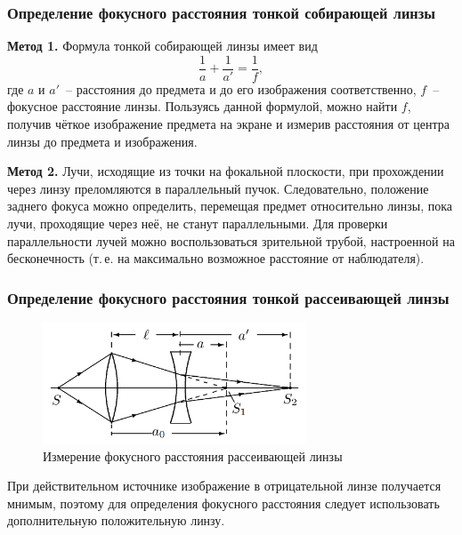 \documentclass[a4paper,12pt]{article} %
\begin{document}
\subsubsection*{Определение фокусного расстояния тонкой собирающей линзы}

\textbf{Метод 1.} Формула тонкой собирающей линзы имеет вид
\begin{equation} \label{convergingLens}
  \frac{1}{a} + \frac{1}{a'} = \frac{1}{f},
\end{equation}
где $a$ и $a'$~-- расстояния до предмета и до его изображения соответственно, $f$~-- фокусное расстояние линзы. Пользуясь данной формулой, можно найти $f$, получив чёткое изображение предмета на экране и измерив расстояния от центра линзы до предмета и изображения.

\textbf{Метод 2.} Лучи, исходящие из точки на фокальной плоскости, при прохождении через линзу преломляются в параллельный пучок. Следовательно, положение заднего фокуса можно определить, перемещая предмет относительно линзы, пока лучи, проходящие через неё, не станут параллельными. Для проверки параллельности лучей можно воспользоваться зрительной трубой, настроенной на бесконечность (т.\,е. на максимально возможное расстояние от наблюдателя).

\subsubsection*{Определение фокусного расстояния тонкой рассеивающей линзы}

\begin{figure}[h]
    \centering
    \includegraphics[width=0.7\textwidth]{divLens.png}
    \caption{Измерение фокусного расстояния рассеивающей линзы}
    \label{fig:divLens}
\end{figure}

При действительном источнике изображение в отрицательной линзе получается мнимым, поэтому для определения фокусного расстояния следует использовать дополнительную положительную линзу. 
\end{document}
